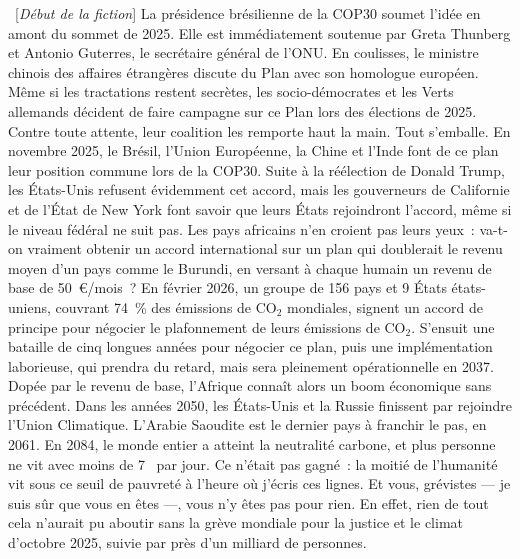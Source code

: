 \documentclass[a5paper,french,openany]{memoir}
\begin{document}
~[\textit{Début de la fiction}] La présidence brésilienne de la COP30 soumet l'idée en amont du sommet de 2025. Elle est immédiatement soutenue par Greta Thunberg et Antonio Guterres, le secrétaire général de l'ONU. 
En coulisses, le ministre chinois des affaires étrangères discute du Plan avec son homologue européen.  
Même si les tractations restent secrètes, les socio-démocrates et les Verts allemands décident de faire campagne sur ce Plan lors des élections de 2025. 
Contre toute attente, leur coalition les remporte haut la main. 
Tout s'emballe. En novembre 2025, le Brésil, l'Union Européenne, la Chine et l'Inde font de ce plan leur position commune lors de la COP30. Suite à la réélection de Donald Trump, les États-Unis refusent évidemment cet accord, mais les gouverneurs de Californie et de l'État de New York font savoir que leurs États rejoindront l'accord, même si le niveau fédéral ne suit pas. Les pays africains n'en croient pas leurs yeux~: 
va-t-on vraiment obtenir un accord international %
sur un plan qui doublerait le revenu moyen d'un pays comme le Burundi, en versant à chaque humain un revenu de base de 50~\euro{}/mois~? En février 2026, un groupe de 156 pays et 9 États états-uniens, couvrant 74~\% des émissions de CO$_\text{2}$ mondiales, signent un accord de principe pour négocier le plafonnement de leurs émissions de CO$_\text{2}$. S'ensuit une bataille de cinq longues années pour négocier ce plan, puis une implémentation laborieuse, qui prendra du retard, mais sera pleinement opérationnelle en 2037. Dopée par le revenu de base, l'Afrique connaît alors un boom économique sans précédent. Dans les années 2050, les États-Unis et la Russie finissent par rejoindre l'Union Climatique. L'Arabie Saoudite est le dernier pays à franchir le pas, en 2061. En 2084, le monde entier a atteint la neutralité carbone, et plus personne ne vit avec moins de 7~\textit{\texteuro{}} par jour. Ce n'était pas gagné~: la moitié de l'humanité vit sous ce seuil de pauvreté à l'heure où j'écris ces lignes. %
Et vous, grévistes --- je suis sûr que vous en êtes ---, vous n'y êtes pas pour rien. En effet, rien de tout cela n'aurait pu aboutir sans la grève mondiale pour la justice et le climat d'octobre 2025, suivie par près d'un milliard de personnes.
\end{document}
